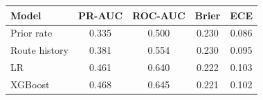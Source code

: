 \begin{tabular}{lcccc}
\toprule
Model & PR-AUC & ROC-AUC & Brier & ECE \\
\midrule
Prior rate & 0.335 & 0.500 & 0.230 & 0.086 \\
Route history & 0.381 & 0.554 & 0.230 & 0.095 \\
LR & 0.461 & 0.640 & 0.222 & 0.103 \\
XGBoost & 0.468 & 0.645 & 0.221 & 0.102 \\
\bottomrule
\end{tabular}
